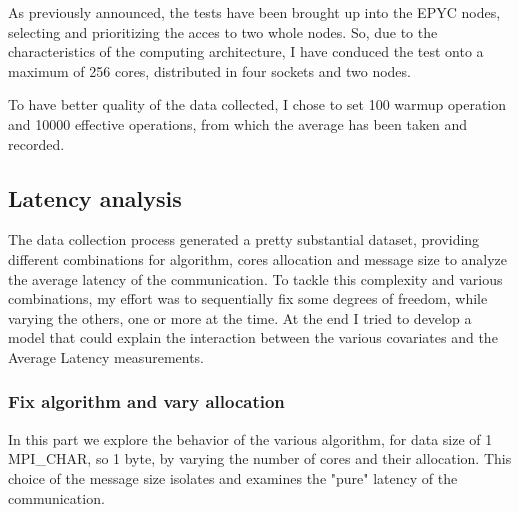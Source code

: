 \documentclass{article}
\begin{document}
	As previously announced, the tests have been brought up into the EPYC nodes, selecting and prioritizing the acces to two whole nodes. So, due to the characteristics of the computing architecture, I have conduced the test onto a maximum of 256 cores, distributed in four sockets and two nodes.
	
	To have better quality of the data collected, I chose to set 100 warmup operation and 10000 effective operations, from which the average has been taken and recorded.
	
	\subsection{Latency analysis}
	
	The data collection process generated a pretty substantial dataset, providing different combinations for algorithm, cores allocation and message size to analyze the average latency of the communication.
	To tackle this complexity and various combinations, my effort was to sequentially fix some degrees of freedom, while varying the others, one or more at the time. At the end I tried to develop a model that could explain the interaction between the various covariates and the Average Latency measurements.
	
	\subsubsection{Fix algorithm and vary allocation}
	
	In this part we explore the behavior of the various algorithm, for data size of 1 MPI\_CHAR, so 1 byte, by varying the number of cores and their allocation. This choice of the message size isolates and examines the "pure" latency of the communication.
	
	
\end{document}

